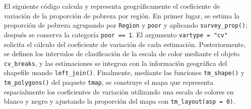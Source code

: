 \documentclass[
  spanish,
  11pt,
  letterpaper,
  oneside,
  open=any]{scrbook}
\begin{document}
El siguiente código calcula y representa geográficamente el coeficiente
de variación de la proporción de pobreza por región. En primer lugar, se
estima la proporción de pobreza agrupando por \texttt{Region} y
\texttt{poor} y aplicando \texttt{survey\_prop()}; después se conserva
la categoría \texttt{poor\ ==\ 1}. El argumento
\texttt{vartype\ =\ "cv"} solicita el cálculo del coeficiente de
variación de cada estimación. Posteriormente, se definen los intervalos
de clasificación de la escala de color mediante el objeto
\texttt{cv\_breaks}, y las estimaciones se integran con la información
geográfica del shapefile usando \texttt{left\_join()}. Finalmente,
mediante las funciones \texttt{tm\_shape()} y \texttt{tm\_polygons()}
del paquete \texttt{tmap}, se construye el mapa que representa
espacialmente los coeficientes de variación utilizando una escala de
colores en blanco y negro y ajustando la proporción del mapa con
\texttt{tm\_layout(asp\ =\ 0)}.
\end{document}
